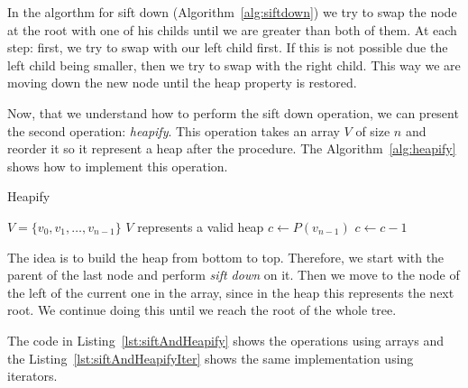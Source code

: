 In the algorthm for sift down (Algorithm~\ref{alg:siftdown}) we try to swap the node at the root with one of his childs until we are greater than both of them.
At each step: first, we try to swap with our left child first.
If this is not possible due the left child being smaller, then we try to swap with the right child.
This way we are moving down the new node until the heap property is restored.

Now, that we understand how to perform the sift down operation, we can present the second operation: \emph{heapify}.
This operation takes an array $V$ of size $n$ and reorder it so it represent a heap after the procedure.
The Algorithm~\ref{alg:heapify} shows how to implement this operation.

\begin{algorithm}[H]
\caption{Heapify}
\label{alg:heapify}
\begin{algorithmic}[1] %
\Require $V = \{ v_0, v_1, \ldots, v_{n-1} \} $ 
\Ensure $V$ represents a valid heap
\State $c \gets P(v_{n-1})$ 
 
    \State {} 
    \State $c \gets c - 1$ 
\EndWhile
\EndProcedure
\end{algorithmic}
\end{algorithm}

The idea is to build the heap from bottom to top.
Therefore, we start with the parent of the last node and perform \emph{sift down} on it.
Then we move to the node of the left of the current one in the array, since in the heap this represents the next root.
We continue doing this until we reach the root of the whole tree.

The code in Listing~\ref{lst:siftAndHeapify} shows the operations using arrays and the Listing~\ref{lst:siftAndHeapifyIter} shows the same implementation using iterators.


